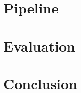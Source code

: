 \documentclass[a4paper,12pt,oneside]{book}
\begin{document}
\chapter{Pipeline}
\label{cap:chapter3}


\chapter{Evaluation}
\label{cap:chapter4}


\chapter{Conclusion}
\label{cap:conclusion}



% 




\end{document}
